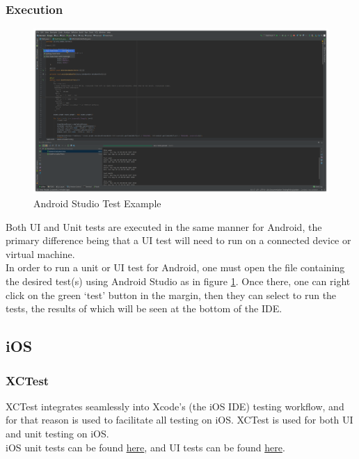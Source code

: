 \documentclass[12pt]{article}
\begin{document}
 \subsubsection{Execution}
   \begin{figure}
  	\includegraphics[width=\textwidth]{images/Android-JUnit-tests.png}
	\caption{Android Studio Test Example}
	\label{fig:android-test}
  \end{figure}
 Both UI and Unit tests are executed in the same manner for Android, the primary difference being that a UI test will need to run on a connected device or virtual machine.\\
\indent In order to run a unit or UI test for Android, one must open the file containing the desired test(s) using Android Studio as in figure \ref{fig:android-test}. Once there, one can right click on the green `test' button in the margin, then they can select to run the tests, the results of which will be seen at the bottom of the IDE.

\subsection{iOS}
\subsubsection{XCTest}
XCTest integrates seamlessly into Xcode's (the iOS IDE) testing workflow, and for that reason is used to facilitate all testing on iOS. XCTest is used for both UI and unit testing on iOS.\\
\indent iOS unit tests can be found \href{https://github.com/BinaryNinjaz/COS301-Capstone/tree/master/Source/iOS/Harvest/HarvestTests}{here}, and UI tests can be found \href{https://github.com/BinaryNinjaz/COS301-Capstone/tree/master/Source/iOS/Harvest/HarvestUITests}{here}.
\end{document}

